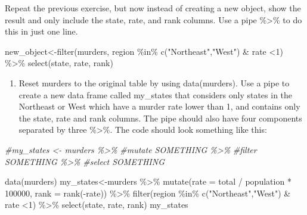 \documentclass[
]{article}
\newenvironment{Shaded}{\begin{snugshade}}{\end{snugshade}}
\newcommand{\AttributeTok}[1]{\textcolor[rgb]{0.77,0.63,0.00}{#1}}
\newcommand{\CommentTok}[1]{\textcolor[rgb]{0.56,0.35,0.01}{\textit{#1}}}
\newcommand{\DecValTok}[1]{\textcolor[rgb]{0.00,0.00,0.81}{#1}}
\newcommand{\FunctionTok}[1]{\textcolor[rgb]{0.00,0.00,0.00}{#1}}
\newcommand{\NormalTok}[1]{#1}
\newcommand{\OtherTok}[1]{\textcolor[rgb]{0.56,0.35,0.01}{#1}}
\newcommand{\SpecialCharTok}[1]{\textcolor[rgb]{0.00,0.00,0.00}{#1}}
\newcommand{\StringTok}[1]{\textcolor[rgb]{0.31,0.60,0.02}{#1}}
\providecommand{\tightlist}{%
  \setlength{\itemsep}{0pt}\setlength{\parskip}{0pt}}
\begin{document}
Repeat the previous exercise, but now instead of creating a new object,
show the result and only include the state, rate, and rank columns. Use
a pipe \%\textgreater\% to do this in just one line.

\begin{Shaded}
\begin{Highlighting}[]
\NormalTok{new\_object}\OtherTok{\textless{}{-}}\FunctionTok{filter}\NormalTok{(murders, region }\SpecialCharTok{\%in\%} \FunctionTok{c}\NormalTok{(}\StringTok{"Northeast"}\NormalTok{,}\StringTok{"West"}\NormalTok{) }\SpecialCharTok{\&}\NormalTok{ rate }\SpecialCharTok{\textless{}}\DecValTok{1}\NormalTok{) }\SpecialCharTok{\%\textgreater{}\%} 
\FunctionTok{select}\NormalTok{(state, rate, rank)}
\end{Highlighting}
\end{Shaded}

\begin{enumerate}
\def\labelenumi{\arabic{enumi}.}
\setcounter{enumi}{1}
\tightlist
\item
  Reset murders to the original table by using data(murders). Use a pipe
  to create a new data frame called my\_states that considers only
  states in the Northeast or West which have a murder rate lower than 1,
  and contains only the state, rate and rank columns. The pipe should
  also have four components separated by three \%\textgreater\%. The
  code should look something like this:
\end{enumerate}

\begin{Shaded}
\begin{Highlighting}[]
\CommentTok{\#my\_states \textless{}{-} murders \%\textgreater{}\%}
  \CommentTok{\#mutate SOMETHING \%\textgreater{}\% }
  \CommentTok{\#filter SOMETHING \%\textgreater{}\% }
  \CommentTok{\#select SOMETHING}
\end{Highlighting}
\end{Shaded}

\begin{Shaded}
\begin{Highlighting}[]
\FunctionTok{data}\NormalTok{(murders)}
\NormalTok{my\_states}\OtherTok{\textless{}{-}}\NormalTok{murders }\SpecialCharTok{\%\textgreater{}\%} 
  \FunctionTok{mutate}\NormalTok{(}\AttributeTok{rate =}\NormalTok{  total }\SpecialCharTok{/}\NormalTok{ population }\SpecialCharTok{*} \DecValTok{100000}\NormalTok{, }\AttributeTok{rank =} \FunctionTok{rank}\NormalTok{(}\SpecialCharTok{{-}}\NormalTok{rate)) }\SpecialCharTok{\%\textgreater{}\%} 
  \FunctionTok{filter}\NormalTok{(region }\SpecialCharTok{\%in\%} \FunctionTok{c}\NormalTok{(}\StringTok{"Northeast"}\NormalTok{,}\StringTok{"West"}\NormalTok{) }\SpecialCharTok{\&}\NormalTok{ rate }\SpecialCharTok{\textless{}}\DecValTok{1}\NormalTok{) }\SpecialCharTok{\%\textgreater{}\%} 
  \FunctionTok{select}\NormalTok{(state, rate, rank)}
\NormalTok{my\_states}
\end{Highlighting}
\end{Shaded}
\end{document}
